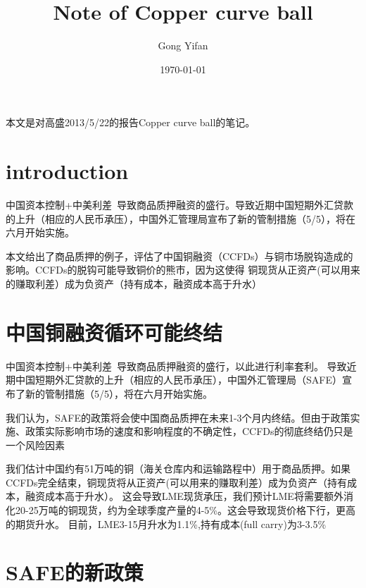 \documentclass{article}
\title{Note of Copper curve ball}
\author{Gong Yifan}
\date{\today}
\begin{document}
\maketitle
\tableofcontents
本文是对高盛2013/5/22的报告Copper curve ball的笔记。\par
\section{introduction}
中国资本控制+中美利差~导致商品质押融资的盛行。导致近期中国短期外汇贷款的上升（相应的人民币承压），中国外汇管理局宣布了新的管制措施（5/5），将在六月开始实施。\par
本文给出了商品质押的例子，评估了中国铜融资（CCFDs）与铜市场脱钩造成的影响。CCFDs的脱钩可能导致铜价的熊市，因为这使得
{\color{red}铜现货从正资产(可以用来的赚取利差）成为负资产（持有成本，融资成本高于升水）}

\section{中国铜融资循环可能终结}
中国资本控制+中美利差~导致商品质押融资的盛行，以此进行利率套利。
导致近期中国短期外汇贷款的上升（相应的人民币承压），中国外汇管理局（SAFE）宣布了新的管制措施（5/5），将在六月开始实施。\par
我们认为，SAFE的政策将会使中国商品质押在未来1-3个月内终结。但由于政策实施、政策实际影响市场的速度和影响程度的不确定性，CCFDs的彻底终结仍只是一个风险因素\par
我们估计中国约有51万吨的铜（海关仓库内和运输路程中）用于商品质押。如果CCFDs完全结束，铜现货将从正资产(可以用来的赚取利差）成为负资产（持有成本，融资成本高于升水）。
这会导致LME现货承压，我们预计LME将需要额外消化20-25万吨的铜现货，约为全球季度产量的4-5\%。这会导致现货价格下行，更高的期货升水。
目前，LME3-15月升水为1.1\%,持有成本(full carry)为3-3.5\%\par

\section{SAFE的新政策}
\end{document}
